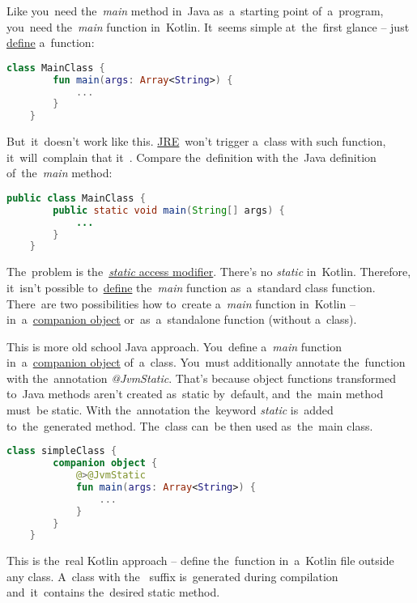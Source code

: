 Like you~need the~\textit{main} method in~Java as~a~starting point of~a~program, you~need the~\textit{main} function in~Kotlin.
It~seems simple at~the~first glance -- just \hyperref[declarationdefinition]{define} a~function:
\begin{lstlisting}[language=Kotlin]
    class MainClass {
        fun main(args: Array<String>) {
            ...
        }
    }
\end{lstlisting}

\noindent But~it~doesn't work like this.
\hyperref[jdkjrejvm]{JRE}~won't trigger a~class with such function, it~will~complain that it~.
Compare the~definition with the~Java definition of~the~\textit{main} method:
\begin{lstlisting}[language=Java]
    public class MainClass {
        public static void main(String[] args) {
            ...
        }
    }
\end{lstlisting}

\noindent The~problem is the~\hyperref[javastatic]{\textit{static} access modifier}.
There's no \textit{static} in~Kotlin.
Therefore, it~isn't possible to~\hyperref[declarationdefinition]{define} the~\textit{main} function as~a~standard class function.
There~are two possibilities how to~create a~\textit{main} function in~Kotlin -- in~a~\hyperref[kotlincompanionobject]{companion object} or~as~a~standalone function (without a~class).

This is more old school Java approach.
You~define a~\textit{main} function in~a~\hyperref[kotlincompanionobject]{companion object} of~a~class.
You~must additionally annotate the~function with the~annotation \textit{@JvmStatic}.
That's because object functions transformed to~Java methods aren't created as~static by~default, and~the~main method must~be static.
With the~annotation the~keyword \textit{static} is~added to~the~generated method.
The~class can~be then used as~the~main class.

\begin{lstlisting}[language=Kotlin, title={Main function in~a~companion object}]
    class simpleClass {
        companion object {
            @>@JvmStatic
            fun main(args: Array<String>) {
                ...
            }
        }
    }
\end{lstlisting}

This is the~real Kotlin approach -- define the~function in~a~Kotlin file outside any class.
A~class with \mbox{the } suffix is~generated during compilation and~it~contains the~desired static method.

